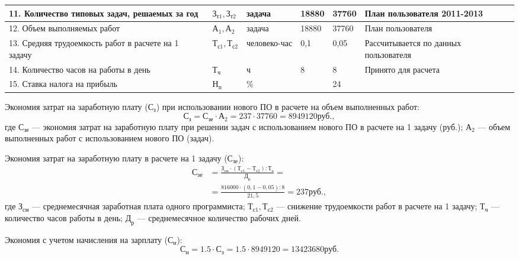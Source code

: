 \begin{table}[ht]
\begin{tabularx}{\textwidth}{| X | p{1.1cm} | p{1.1cm} | p{1.3cm} | p{1.3cm} | p{3cm} |}
    \hline
    11. Количество типовых задач, решаемых за год & $\text{З}_\text{т1}, \text{З}_\text{т2}$ & задача & 18880 & 37760 & План пользователя 2011-2013\\
    \hline
    12. Объем выполняемых работ & $\text{А}_\text{1}, \text{А}_\text{2}$ & задача & 18880 & 37760 & План пользователя\\
    \hline
    13. Средняя трудоемкость работ в расчете на 1 задачу & $\text{Т}_\text{с1}, \text{Т}_\text{с2}$ & человеко-час & 0,1 & 0,05 & Рассчитывается по данных пользователя\\
    \hline
    14. Количество часов на работы в день & $\text{Т}_\text{ч}$ & ч & 8 & 8 & Принято для расчета\\
    \hline
    15. Ставка налога на прибыль & $\text{Н}_\text{п}$ & \% & & 24 & \\
    \hline
  \end{tabularx}
\end{table}

Экономия затрат на заработную плату ($\text{С}_\text{з}$) при использовании нового ПО в расчете на объем выполненных работ:
\begin{displaymath}
  \text{С}_\text{з} = \text{С}_\text{зе} \cdot \text{А}_\text{2} = 237 \cdot 37760 = 8949120 \text{руб.},
\end{displaymath}
где $\text{С}_\text{зе}$ --- экономия затрат на заработную плату при решении задач с использованием нового ПО в расчете на 1 задачу (руб.); $\text{А}_\text{2}$ --- объем выполненных работ с использованием нового ПО (задач).

Экономия затрат на заработную плату в расчете на 1 задачу ($\text{С}_\text{зе}$):
\begin{align*}
  \text{С}_\text{зе} &= \frac{\text{З}_\text{см} \cdot (\text{Т}_\text{с1} - \text{Т}_\text{с2}) : \text{Т}_\text{ч}}{\text{Д}_\text{р}} =\\
  &= \frac{816000 \cdot (0,1 - 0,05) : 8}{21,5} = 237 \text{руб.},
\end{align*}
где $\text{З}_\text{см}$ --- среднемесячная заработная плата одного программиста; $\text{Т}_\text{с1}, \text{Т}_\text{с2}$ --- снижение трудоемкости работ в расчете на 1 задачу; $\text{Т}_\text{ч}$ --- количество часов работы в день; $\text{Д}_\text{р}$ --- среднемесячное количество рабочих дней.

Экономия с учетом начисления на зарплату ($\text{С}_\text{н}$):
\begin{displaymath}
  \text{С}_\text{н} = 1.5 \cdot \text{С}_\text{з} = 1.5 \cdot 8949120 = 13423680 \text{руб.}
\end{displaymath}


